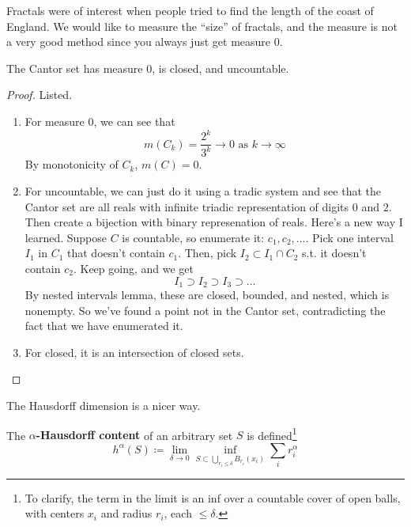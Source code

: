  Fractals were of interest when people tried to find the length of the coast of England. We would like to measure the ``size'' of fractals, and the measure is not a very good method since you always just get measure $0$. 

  \begin{theorem}
    The Cantor set has measure $0$, is closed, and uncountable. 
  \end{theorem}
  \begin{proof}
    Listed. 
    \begin{enumerate}
      \item For measure $0$, we can see that 
      \begin{equation}
        m(C_k) = \frac{2^k}{3^k} \to 0 \text{ as } k \to \infty 
      \end{equation}
      By monotonicity of $C_k$, $m(C) = 0$. 

      \item For uncountable, we can just do it using a tradic system and see that the Cantor set are all reals with infinite triadic representation of digits $0$ and $2$. Then create a bijection with binary represenation of reals. Here's a new way I learned. Suppose $C$ is countable, so enumerate it: $c_1, c_2, \ldots$. Pick one interval $I_1$ in $C_1$ that doesn't contain $c_1$. Then, pick $I_2 \subset I_1 \cap C_2$ s.t. it doesn't contain $c_2$. Keep going, and we get 
      \begin{equation}
        I_1 \supset I_2 \supset I_3 \supset \ldots 
      \end{equation}
      By nested intervals lemma, these are closed, bounded, and nested, which is nonempty. So we've found a point not in the Cantor set, contradicting the fact that we have enumerated it. 

      \item For closed, it is an intersection of closed sets. 
    \end{enumerate}
  \end{proof}

  The Hausdorff dimension is a nicer way. 

  \begin{definition}
    The \textbf{$\alpha$-Hausdorff content} of an arbitrary set $S$ is defined\footnote{To clarify, the term in the limit is an inf over a countable cover of open balls, with centers $x_i$ and radius $r_i$, each $\leq \delta$. }
    \begin{equation}
      h^\alpha (S) \coloneqq \lim_{\delta \to 0} \inf_{S \subset \bigcup_{r_i \leq \delta } B_{r_i} (x_i)} \sum_i r_i^\alpha
    \end{equation}
  \end{definition}

